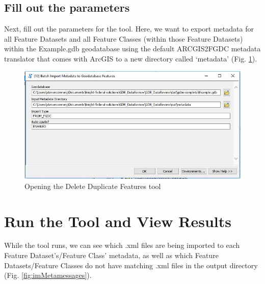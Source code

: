 \documentclass[openany]{book}
\theoremstyle{definition}
\theoremstyle{definition}
\theoremstyle{definition}
\theoremstyle{remark}
\begin{document}
\subsection{Fill out the parameters}\label{fill-out-the-parameters-11}

Next, fill out the parameters for the tool. Here, we want to export
metadata for all Feature Datasets and all Feature Classes (within those
Feature Datasets) within the Example.gdb geodatabase using the default
ARCGIS2FGDC metadata translator that comes with ArcGIS to a new
directory called `metadata' (Fig. \ref{fig:imMetaparams}).

\begin{figure}[H]

{\centering \includegraphics{figures/imMeta-params} 

}

\caption{Opening the Delete Duplicate Features tool}\label{fig:imMetaparams}
\end{figure}

\section{Run the Tool and View
Results}\label{run-the-tool-and-view-results-11}

While the tool runs, we can see which .xml files are being imported to
each Feature Dataset's/Feature Class' metadata, as well as which Feature
Datasets/Feature Classes do not have matching .xml files in the output
directory (Fig. \ref{fig:imMetamessages}).
\end{document}
